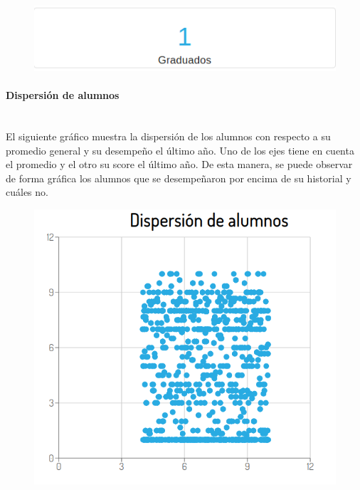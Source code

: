 \begin{figure}[!htbp]
  \centering
    \includegraphics[scale=0.4]{images/seguimiento-academico/sa-graduados.png}
  \label{fig:sa-graduados}
\end{figure}

\paragraph{Dispersión de alumnos} \mbox{}\\
El siguiente gráfico muestra la dispersión de los alumnos con respecto a su promedio general y su desempeño el último año. Uno de los ejes tiene en cuenta el promedio y el otro su score el último año. De esta manera, se puede observar de forma gráfica los alumnos que se desempeñaron por encima de su historial y cuáles no.

\begin{figure}[!htbp]
  \centering
    \includegraphics[scale=0.4]{images/seguimiento-academico/sa-dispersion.png}
  \label{fig:sa-dispersion}
\end{figure}


